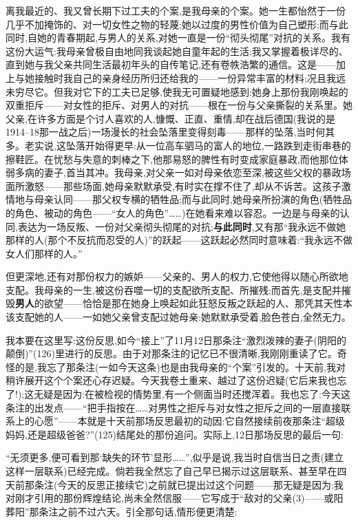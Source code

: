 离我最近的、我又曾长期下过工夫的个案,是我母亲的个案。她一生都怡然于一份几乎不加掩饰的、对一切女性之物的轻蔑;她以过度的男性价值为自己塑形;而与此同时,自她的青春期起,与男人的关系,对她一直是一份“彻头彻尾”对抗的关系。我有这份大运气:我母亲曾极自由地同我谈起她自童年起的生活;我又掌握着极详尽的、直到她与我父亲共同生活最初年头的自传笔记,还有卷帙浩繁的通信。这是——加上与她接触时我自己的亲身经历所归还给我的——一份异常丰富的材料;况且我远未穷尽它。但我对它下的工夫已足够,使我无可置疑地感到:她身上那份我刚唤起的双重拒斥——对女性的拒斥、对男人的对抗——根在一份与父亲撕裂的关系里。她父亲,在许多方面是个讨人喜欢的人,慷慨、正直、重情,却在战后德国(我说的是1914--18那一战之后)一场漫长的社会坠落里变得刻毒——那样的坠落,当时何其多。老实说,这坠落开始得更早:从一位高车驷马的富人的地位,一路跌到走街串巷的擦鞋匠。在忧愁与失意的刺棒之下,他那易怒的脾性有时变成家庭暴政,而他那位体弱多病的妻子,首当其冲\dmark{}。我母亲,对父亲一如对母亲依恋至深,被这些父权的暴政场面所激怒——那些场面,她母亲默默承受,有时实在撑不住了,却从不诉苦。这孩子激情地与母亲认同——那父权专横的牺牲品;而与此同时,她母亲所扮演的角色(牺牲品的角色、被动的角色——“女人的角色”……)在她看来难以容忍。一边是与母亲的认同,表达为一场反叛、一份对父亲彻头彻尾的对抗;\textbf{与此同时},又有那“我永远不做她那样的人(那个不反抗而忍受的人)”的跃起——这跃起必然同时意味着:“我永远不做女人们那样的人。”

但更深地,还有对那份权力的嫉妒——父亲的、男人的权力,它使他得以随心所欲地支配。我母亲的一生,被这份吞噬一切的支配欲所支配、所摧残;而首先,是支配并摧毁\textbf{男人}的欲望——恰恰是那在她身上唤起如此狂怒反叛之跃起的人、那凭其天性本该支配她的人——一如她父亲曾支配过她母亲:她默默承受着,脸色苍白,全然无力。

我本要在这里写:这份反思,如今“接上”了11月12日那条注“激烈泼辣的妻子(阴阳的颠倒)”(126)里进行的反思。由于对那条注的记忆已不很清晰,我刚刚重读了它。奇怪的是,我忘了那条注(一如今天这条)也是由我母亲的“个案”引发的。十天前,我对稍许展开这个个案还心存迟疑。今天我卷土重来、越过了这份迟疑(它后来我也忘了!);这无疑是因为:在被检视的情势里,有一个侧面当时还搅浑着。我也忘了:今天这条注的出发点——“把手指按在……对男性之拒斥与对女性之拒斥之间的一层直接联系上的心愿”——本就是十天前那场反思最初的动因:它自然接续前夜那条注“超级妈妈,还是超级爸爸?”(125)结尾处的那份追问。实际上,12日那场反思的最后一句:

“无须更多,便可看到那‘缺失的环节’显形……”,似乎是说,我当时自信当日之责(建立\dmark{}这样一层联系)已经完成。倘若我全然忘了自己早已揭示过这层联系、甚至早在四天前那条注(今天的反思正接续它)之前就已提出过这个问题——那无疑是因为:我对刚才引用的那份辉煌结论,尚未全然信服——它写成于“敌对的父亲(3)——或阳葬阳”那条注之前不过六天。引全那句话,情形便更清楚:

